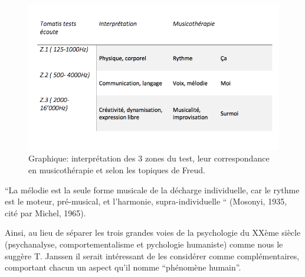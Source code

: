 \begin{figure}
	\centering
	\includegraphics[width=0.7\linewidth]{images/testinterpmusico}
	\caption[ L'interprétation des 3 zones et leur correspondance
        en musicothérapie]{Graphique: interprétation des 3 zones du
          test, leur correspondance en musicothérapie et selon les
          topiques de Freud.}
       
	\label{graphiquecolonnetestmusico}
      \end{figure}




``La mélodie est la seule forme musicale de la décharge individuelle,
car le rythme est le moteur, pré-musical, et l'harmonie,
supra-individuelle `` (Mosonyi, 1935, cité par Michel, 1965).


Ainsi, au lieu de séparer les trois grandes voies de la psychologie du
XXème siècle (psychanalyse, comportementalisme et pychologie
humaniste) comme nous le suggère T. Janssen
\autocite[197]{van_eersel_cerveau} il serait intéressant de les
considérer comme complémentaires, comportant chacun un aspect qu'il
nomme ``phénomène humain''.








      


  
 	
 	
 	
 
       
   
 





      



 











